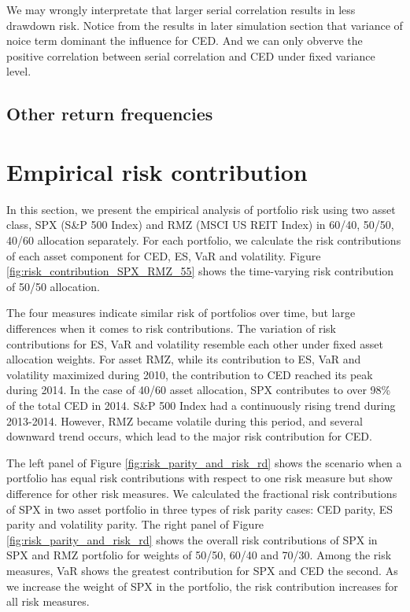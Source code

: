 \documentclass[11pt]{article}
\begin{document}
We may wrongly interpretate that larger serial correlation results in less drawdown risk. Notice from the results in later simulation section that variance of noice term dominant the influence for CED. And we can only obverve the positive correlation between serial correlation and CED under fixed variance level.


\subsection{Other return frequencies}

\section{Empirical risk contribution}

In this section, we present the empirical analysis of portfolio risk using two asset class, SPX (S\&P 500 Index) and RMZ (MSCI US REIT Index) in 60/40, 50/50, 40/60 allocation separately. For each portfolio, we calculate the risk contributions of each asset component for CED, ES, VaR and volatility. Figure \ref{fig:risk_contribution_SPX_RMZ_55} shows the time-varying risk contribution of 50/50 allocation. 

The four measures indicate similar risk of portfolios over time, but large differences when it comes to risk contributions. The variation of risk contributions for ES, VaR and volatility resemble each other under fixed asset allocation weights. For asset RMZ, while its contribution to ES, VaR and volatility maximized during 2010, the contribution to CED reached its peak during 2014. In the case of 40/60 asset allocation, SPX contributes to over 98\% of the total CED in 2014. S\&P 500 Index had a continuously rising trend during 2013-2014. However, RMZ became volatile during this period, and several downward trend occurs, which lead to the major risk contribution for CED.

The left panel of Figure \ref{fig:risk_parity_and_risk_rd} shows the scenario when a portfolio has equal risk contributions with respect to one risk measure but show difference for other risk measures. We calculated the fractional risk contributions of SPX in two asset portfolio in three types of risk parity cases: CED parity, ES parity and volatility parity. The right panel of Figure \ref{fig:risk_parity_and_risk_rd} shows the overall risk contributions of SPX in SPX and RMZ portfolio for weights of 50/50, 60/40 and 70/30. Among the risk measures, VaR shows the greatest contribution for SPX and CED the second. As we increase the weight of SPX in the portfolio, the risk contribution increases for all risk measures. 
\end{document}
